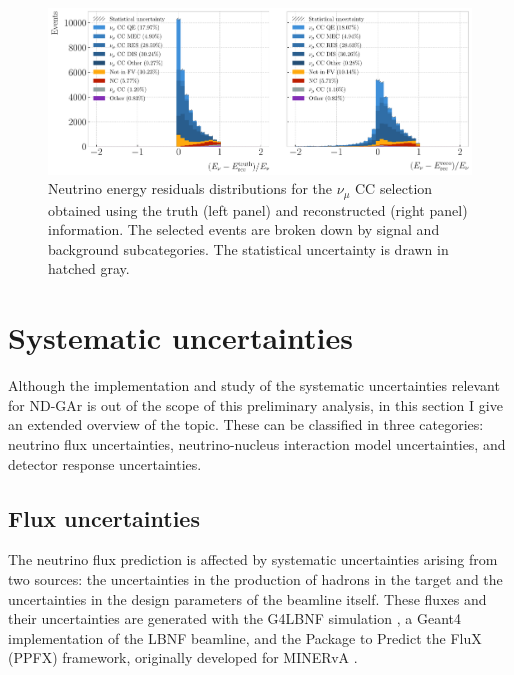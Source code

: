 \begin{figure}[t]
    \centering
    \includegraphics[width=.99\linewidth]{Images/GAr_selection/numuCC_selection_truth_reco_energy_fresiduals_comparison.pdf}
    \caption[Neutrino energy residuals distributions for the $\nu_{\mu}$ CC selection obtained using the truth and reconstructed information]{Neutrino energy residuals distributions for the $\nu_{\mu}$ CC selection obtained using the truth (left panel) and reconstructed (right panel) information. The selected events are broken down by signal and background subcategories. The statistical uncertainty is drawn in hatched gray.}
    \label{fig:numuCC_reconstructed_fresiduals}
\end{figure}

\section{Systematic uncertainties}
\label{sec:gar_systematics}

Although the implementation and study of the systematic uncertainties relevant for ND-GAr is out of the scope of this preliminary analysis, in this section I give an extended overview of the topic. These can be classified in three categories: neutrino flux uncertainties, neutrino-nucleus interaction model uncertainties, and detector response uncertainties.

\subsection{Flux uncertainties}

The neutrino flux prediction is affected by systematic uncertainties arising from two sources: the uncertainties in the production of hadrons in the target and the uncertainties in the design parameters of the beamline itself. These fluxes and their uncertainties are generated with the G4LBNF simulation \cite{DUNE2020TDR2}, a Geant4 implementation of the LBNF beamline, and the Package to Predict the FluX (PPFX) framework, originally developed for MINERvA \cite{Golan2016}.

